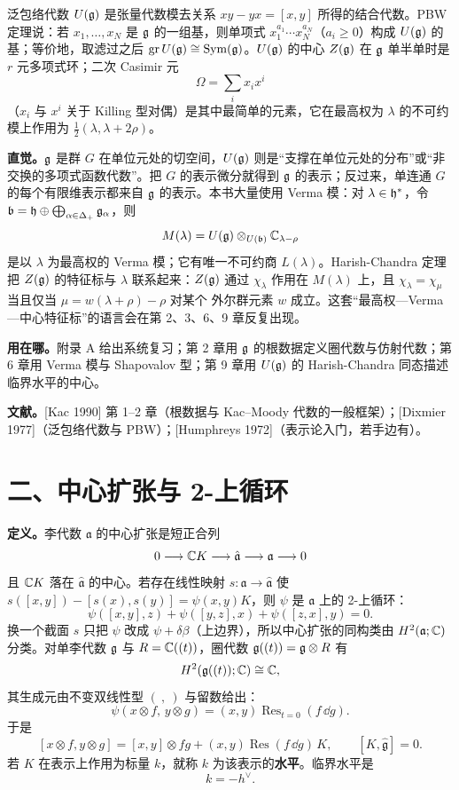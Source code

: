 泛包络代数 $U(\mathfrak{g})$ 是张量代数模去关系 $xy-yx=[x,y]$ 所得的结合代数。PBW 定理说：若 $x_1,\dots,x_N$ 是 $\mathfrak{g}$ 的一组基，则单项式 $x_1^{a_1}\cdots x_N^{a_N}$（$a_i\ge 0$）构成 $U(\mathfrak{g})$ 的基；等价地，取滤过之后 $\operatorname{gr}U(\mathfrak{g})\cong\operatorname{Sym}(\mathfrak{g})$。$U(\mathfrak{g})$ 的中心 $Z(\mathfrak{g})$ 在 $\mathfrak{g}$ 单半单时是 $r$ 元多项式环；二次 Casimir 元
\[
  \Omega=\sum_i x_i x^i
\]
（$x_i$ 与 $x^i$ 关于 Killing 型对偶）是其中最简单的元素，它在最高权为 $\lambda$ 的不可约模上作用为 $\tfrac12(\lambda,\lambda+2\rho)$。

\textbf{直觉。}$\mathfrak{g}$ 是群 $G$ 在单位元处的切空间，$U(\mathfrak{g})$ 则是“支撑在单位元处的分布”或“非交换的多项式函数代数”。把 $G$ 的表示微分就得到 $\mathfrak{g}$ 的表示；反过来，单连通 $G$ 的每个有限维表示都来自 $\mathfrak{g}$ 的表示。本书大量使用 Verma 模：对 $\lambda\in\mathfrak{h}^*$，令 $\mathfrak{b}=\mathfrak{h}\oplus\bigoplus_{\alpha\in\Delta_+}\mathfrak{g}_\alpha$，则
\[
  M(\lambda)=U(\mathfrak{g})\otimes_{U(\mathfrak{b})}\mathbb{C}_{\lambda-\rho}
\]
是以 $\lambda$ 为最高权的 Verma 模；它有唯一不可约商 $L(\lambda)$。Harish-Chandra 定理把 $Z(\mathfrak{g})$ 的特征标与 $\lambda$ 联系起来：$Z(\mathfrak{g})$ 通过 $\chi_\lambda$ 作用在 $M(\lambda)$ 上，且 $\chi_\lambda=\chi_\mu$ 当且仅当 $\mu=w(\lambda+\rho)-\rho$ 对某个 外尔群元素 $w$ 成立。这套“最高权—Verma—中心特征标”的语言会在第 2、3、6、9 章反复出现。

\textbf{用在哪。}附录 A 给出系统复习；第 2 章用 $\mathfrak{g}$ 的根数据定义圈代数与仿射代数；第 6 章用 Verma 模与 Shapovalov 型；第 9 章用 $U(\mathfrak{g})$ 的 Harish-Chandra 同态描述临界水平的中心。

\textbf{文献。}[Kac 1990] 第 1–2 章（根数据与 Kac--Moody 代数的一般框架）；[Dixmier 1977]（泛包络代数与 PBW）；[Humphreys 1972]（表示论入门，若手边有）。

\section*{二、中心扩张与 2-上循环}

\textbf{定义。}李代数 $\mathfrak{a}$ 的中心扩张是短正合列
\[
  0\longrightarrow \mathbb{C} K\longrightarrow \hat{\mathfrak{a}}\longrightarrow \mathfrak{a}\longrightarrow 0
\]
且 $\mathbb{C} K$ 落在 $\hat{\mathfrak{a}}$ 的中心。若存在线性映射 $s:\mathfrak{a}\to\hat{\mathfrak{a}}$ 使 $s([x,y])-[s(x),s(y)]=\psi(x,y)K$，则 $\psi$ 是 $\mathfrak{a}$ 上的 2-上循环：
\[
  \psi([x,y],z)+\psi([y,z],x)+\psi([z,x],y)=0 .
\]
换一个截面 $s$ 只把 $\psi$ 改成 $\psi+\delta\beta$（上边界），所以中心扩张的同构类由 $H^2(\mathfrak{a};\mathbb{C})$ 分类。对单李代数 $\mathfrak{g}$ 与 $R=\mathbb{C}((t))$，圈代数 $\mathfrak{g}((t))=\mathfrak{g}\otimes R$ 有
\[
  H^2(\mathfrak{g}((t));\mathbb{C})\cong\mathbb{C} ,
\]
其生成元由不变双线性型 $(\ ,\ )$ 与留数给出：
\[
  \psi(x\otimes f,\,y\otimes g)=(x,y)\operatorname{Res}_{t=0}(f\,\dd g).
\]
于是
\[
  [x\otimes f,y\otimes g]=[x,y]\otimes fg+(x,y)\operatorname{Res}(f\,\dd g)\,K,\qquad [K,\hat{\mathfrak{g}}]=0 .
\]
若 $K$ 在表示上作用为标量 $k$，就称 $k$ 为该表示的\textbf{水平}。临界水平是
\[
  k=-h^\vee .
\]

